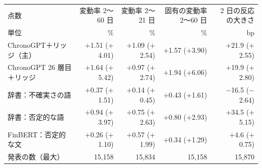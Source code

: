 \begin{tabular}{@{}lrrrr@{}}
\toprule
点数 & 変動率 2〜60 日 & 変動率 2〜21 日 & 固有の変動率 2〜60 日 & 2 日の反応の大きさ \\
単位 & \% & \% & \% & bp \\
\midrule
ChronoGPT＋リッジ（主） & $+$1.51 ($+$4.01) & $+$1.09 ($+$2.54) & $+$1.57 ($+$3.90) & $+$21.9 ($+$2.55) \\
ChronoGPT 26 層目＋リッジ & $+$1.64 ($+$5.42) & $+$0.97 ($+$2.74) & $+$1.94 ($+$6.06) & $+$19.9 ($+$2.80) \\
辞書：不確実さの語 & $+$0.37 ($+$1.51) & $+$0.14 ($+$0.45) & $+$0.43 ($+$1.61) & $-$16.5 ($-$2.64) \\
辞書：否定的な語 & $+$0.94 ($+$3.97) & $+$0.75 ($+$2.63) & $+$0.80 ($+$2.93) & $+$34.5 ($+$5.15) \\
FinBERT：否定的な文 & $+$0.26 ($+$1.10) & $+$0.57 ($+$1.99) & $+$0.34 ($+$1.29) & $+$4.6 ($+$0.75) \\
\midrule
発表の数（最大） & 15,158 & 15,834 & 15,158 & 15,870 \\
\bottomrule
\end{tabular}
